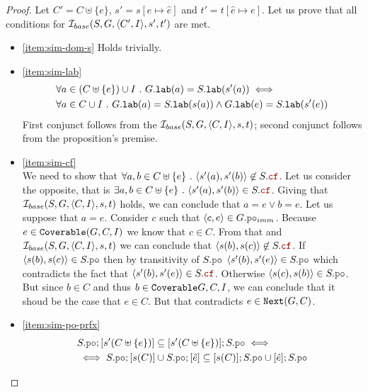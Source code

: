 \documentclass[12pt]{article}
\begin{document}
\begin{proof}
  Let $C' = C \uplus \{e\}$, $s' = s[e \mapsto \hat{e}]$ and $t' = t[\hat{e} \mapsto e]$.
  Let us prove that all conditions for $\mathcal{I}_{base}(S, G, \langle C', I \rangle, s', t')$ are met. 
  \begin{itemize}
  \item \ref{item:sim-dom-s}
    Holds trivially.
  \item \ref{item:sim-lab}
    \begin{equation}
      \begin{split}
        & \forall{a \in (C \uplus \{e\}) \cup I} ~.~ G.{\mathtt{lab}}(a) = S.{\mathtt{lab}}(s'(a)) \iff \\
        & \forall{a \in C \cup I} ~.~ G.{\mathtt{lab}}(a) = S.{\mathtt{lab}}(s(a)) \wedge G.{\mathtt{lab}}(e) = S.{\mathtt{lab}}(s'(e))
      \end{split}
    \end{equation}
    First conjunct follows from the $\mathcal{I}_{base}(S, G, \langle C, I \rangle, s, t)$;
    second conjunct follows from the proposition's premise.

  \item \ref{item:sim-cf} \\
    We need to show that
    $\forall{a, b \in \lC \uplus \{e\}} ~.~ \tup{s'(a), s'(b)} \not\in S.\lCF$.
    Let us consider the opposite, that is
    $\exists{a, b \in \lC \uplus \{e\}} ~.~ \tup{s'(a), s'(b)} \in S.\lCF$.
    Giving that $\mathcal{I}_{base}(S, G, \langle C, I \rangle, s, t)$ holds,
    we can conclude that $a = e \vee b = e$.
    Let us suppose that $a = e$.
    Consider $c$ such that $\tup{c, e} \in G.\lPO_{imm}$.
    Because $e \in {\mathtt{Coverable}}(G, C, I)$ we know that $c \in C$.
    From that and $\mathcal{I}_{base}(S, G, \langle C, I \rangle, s, t)$
    we can conclude that $\tup{s(b), s(c)} \not\in S.\lCF$.
    If $\tup{s(b), s(c)} \in S.\lPO$ then by transitivity of $S.\lPO$
    $\tup{s'(b), s'(e)} \in S.\lPO$
    which contradicts the fact that $\tup{s'(b), s'(e)} \in S.\lCF$.
    Otherwise $\tup{s(c), s(b)} \in S.\lPO$.
    But since $b \in C$ and thus $b \in {\mathtt{Coverable}}{G, C, I}$,
    we can conclude that it shoud be the case that $e \in C$.
    But that contradicts $e \in {\mathtt{Next}}(G, C)$.

  \item \ref{item:sim-po-prfx} \\
    
    \begin{equation*}
      \begin{split}
        &     S.\lPO;[s'(C \uplus \{e\})] \subseteq [s'(C \uplus \{e\})];S.\lPO \iff \\
        &\iff S.\lPO;[s(C)] \cup S.\lPO;[\hat{e}] \subseteq [s(C)];S.\lPO \cup [\hat{e}];S.\lPO
      \end{split}
    \end{equation*}


\end{itemize}
\end{proof}
\end{document}
